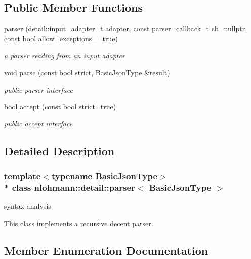 \subsection*{Public Member Functions}
\begin{DoxyCompactItemize}
\item 
\hyperlink{classnlohmann_1_1detail_1_1parser_a693aa2a6c0cc665e0e45bacf055460e6}{parser} (\hyperlink{namespacenlohmann_1_1detail_ae132f8cd5bb24c5e9b40ad0eafedf1c2}{detail\+::input\+\_\+adapter\+\_\+t} adapter, const parser\+\_\+callback\+\_\+t cb=nullptr, const bool allow\+\_\+exceptions\+\_\+=true)\hypertarget{classnlohmann_1_1detail_1_1parser_a693aa2a6c0cc665e0e45bacf055460e6}{}\label{classnlohmann_1_1detail_1_1parser_a693aa2a6c0cc665e0e45bacf055460e6}

\begin{DoxyCompactList}\small\item\em a parser reading from an input adapter \end{DoxyCompactList}\item 
void \hyperlink{classnlohmann_1_1detail_1_1parser_a14338d8f3174601c0b2b7ef28752ab17}{parse} (const bool strict, Basic\+Json\+Type \&result)
\begin{DoxyCompactList}\small\item\em public parser interface \end{DoxyCompactList}\item 
bool \hyperlink{classnlohmann_1_1detail_1_1parser_a20997b42262856935b60fc91bf05bf3f}{accept} (const bool strict=true)
\begin{DoxyCompactList}\small\item\em public accept interface \end{DoxyCompactList}\end{DoxyCompactItemize}


\subsection{Detailed Description}
\subsubsection*{template$<$typename Basic\+Json\+Type$>$\\*
class nlohmann\+::detail\+::parser$<$ Basic\+Json\+Type $>$}

syntax analysis 

This class implements a recursive decent parser. 

\subsection{Member Enumeration Documentation}
